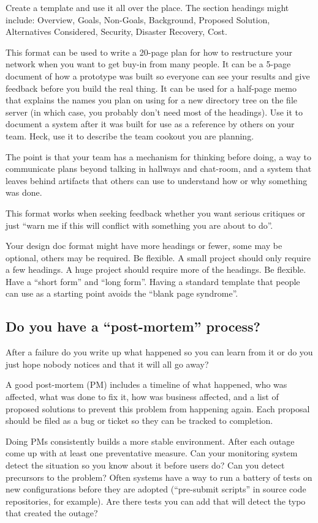\documentclass{article}
\begin{document}
Create a template and use it all over the place. The section headings might include: Overview, Goals, Non-Goals, Background, Proposed Solution, Alternatives Considered, Security, Disaster Recovery, Cost.

This format can be used to write a 20-page plan for how to restructure your network when you want to get buy-in from many people. It can be a 5-page document of how a prototype was built so everyone can see your results and give feedback before you build the real thing. It can be used for a half-page memo that explains the names you plan on using for a new directory tree on the file server (in which case, you probably don't need most of the headings). Use it to document a system after it was built for use as a reference by others on your team. Heck, use it to describe the team cookout you are planning.

The point is that your team has a mechanism for thinking before doing, a way to communicate plans beyond talking in hallways and chat-room, and a system that leaves behind artifacts that others can use to understand how or why something was done.

This format works when seeking feedback whether you want serious critiques or just ``warn me if this will conflict with something you are about to do''.

Your design doc format might have more headings or fewer, some may be optional, others may be required. Be flexible. A small project should only require a few headings. A huge project should require more of the headings. Be flexible. Have a ``short form'' and ``long form''. Having a standard template that people can use as a starting point avoids the ``blank page syndrome''.

\subsection{Do you have a ``post-mortem'' process? \Checkmark}
After a failure do you write up what happened so you can learn from it or do you just hope nobody notices and that it will all go away?

A good post-mortem (PM) includes a timeline of what happened, who was affected, what was done to fix it, how was business affected, and a list of proposed solutions to prevent this problem from happening again. Each proposal should be filed as a bug or ticket so they can be tracked to completion.

Doing PMs consistently builds a more stable environment. After each outage come up with at least one preventative measure. Can your monitoring system detect the situation so you know about it before users do? Can you detect precursors to the problem? Often systems have a way to run a battery of tests on new configurations before they are adopted (``pre-submit scripts'' in source code repositories, for example). Are there tests you can add that will detect the typo that created the outage?
\end{document}
